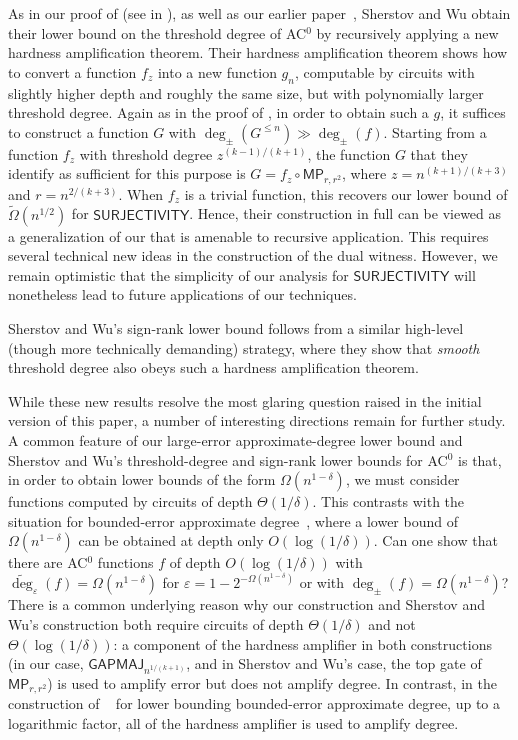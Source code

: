 \documentclass{toc}
\newcommand{\GAPMAJ}{\mathsf{GAPMAJ}}
\newcommand{\eps}{\varepsilon}
\newcommand{\adeg}{\widetilde{\operatorname{deg}}}
\begin{document}
As in our proof of  (see  in ), as well as our %
earlier paper~\cite{adegsurj},
Sherstov and Wu obtain their %
lower bound on the threshold degree of %
 AC$^0$ by recursively applying a new hardness amplification theorem. Their hardness amplification theorem shows how to convert a function $f_z$ into a new function $g_n$, computable by circuits with slightly higher depth and roughly the same size, but with polynomially larger threshold degree. Again as in the proof of , in order to obtain such a $g$, it suffices to construct a function $G$ with $\deg_{\pm}(G^{\le n}) \gg \deg_{\pm}(f)$. Starting from a function $f_z$ with threshold degree $z^{(k-1)/(k+1)}$, the function $G$ that they identify as sufficient for this purpose is $G = f_z \circ \mathsf{MP}_{r, r^2}$, where $z = n^{(k+1)/(k+3)}$ and $r = n^{2/(k+3)}$. When $f_z$ is a trivial function, this recovers our lower bound of $\tilde{\Omega}(n^{1/2})$ for $\mathsf{SURJECTIVITY}$. Hence, their construction in full can be viewed as a generalization of our  that is amenable to recursive application. 
This requires several technical new ideas in the construction of the dual witness. However, we remain optimistic that the simplicity of our analysis for 
$\mathsf{SURJECTIVITY}$ will nonetheless lead to future applications of our techniques.

Sherstov and Wu's sign-rank lower bound follows from a similar high-level (though more technically demanding) strategy, where they show that \emph{smooth} threshold degree also obeys such a hardness amplification theorem.

While these new results resolve the most glaring question raised in the initial version of this %
paper, %
a number of interesting directions remain for further study. A common feature of our large-error %
approximate-degree %
lower bound and Sherstov and Wu's %
threshold-degree %
and sign-rank lower bounds for AC$^0$ is that, in order to obtain lower bounds of the form $\Omega(n^{1-\delta})$, we must consider functions computed by circuits of depth $\Theta(1/\delta)$. This contrasts with the situation for %
bounded-error %
approximate degree~\cite{adegsurj}, where a lower bound of $\Omega(n^{1-\delta})$ can be obtained at depth only $O(\log(1/\delta))$. Can one show that there are AC$^0$ functions $f$ of depth $O(\log(1/\delta))$ with $\adeg_{\eps}(f) = \Omega(n^{1-\delta})$ for $\eps = 1 - 2^{-\Omega(n^{1-\delta})}$ or with $\deg_{\pm}(f) = \Omega(n^{1-\delta})$?  There is a common underlying reason why our construction and Sherstov and Wu's construction both require circuits of depth $\Theta(1/\delta)$ and not $\Theta(\log(1/\delta))$:  a component of the hardness amplifier in both constructions (in our case, $\GAPMAJ_{n^{1/(k+1)}}$,
and in Sherstov and Wu's case, the top gate of $\mathsf{MP}_{r, r^2}$) is used to amplify error but does not amplify degree. In contrast, in the construction of 
~\cite{adegsurj} for lower bounding bounded-error approximate degree, up to a logarithmic factor, all of the hardness amplifier is used to amplify degree. 
\end{document}
